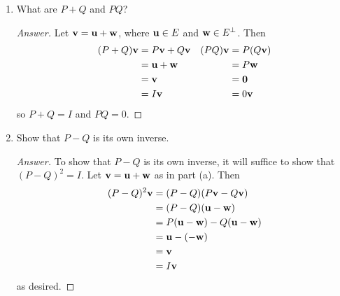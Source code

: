 \documentclass[../psets.tex]{subfiles}
\begin{document}
\begin{enumerate}[label={\textbf{3.\arabic*.}}]
    \begin{enumerate}
        \item What are $P+Q$ and $PQ$?
        \begin{proof}[Answer]
            Let $\mathbf{v}=\mathbf{u}+\mathbf{w}$, where $\mathbf{u}\in E$ and $\mathbf{w}\in E^\perp$. Then
            \begin{align*}
                (P+Q)\mathbf{v} &= P\mathbf{v}+Q\mathbf{v}&
                    (PQ)\mathbf{v} &= P(Q\mathbf{v})\\
                &= \mathbf{u}+\mathbf{w}&
                    &= P\mathbf{w}\\
                &= \mathbf{v}&
                    &= \bm{0}\\
                &= I\mathbf{v}&
                    &= 0\mathbf{v}
            \end{align*}
            so $P+Q=I$ and $PQ=0$.
        \end{proof}
        \item Show that $P-Q$ is its own inverse.
        \begin{proof}[Answer]
            To show that $P-Q$ is its own inverse, it will suffice to show that $(P-Q)^2=I$. Let $\mathbf{v}=\mathbf{u}+\mathbf{w}$ as in part (a). Then
            \begin{align*}
                (P-Q)^2\mathbf{v} &= (P-Q)(P\mathbf{v}-Q\mathbf{v})\\
                &= (P-Q)(\mathbf{u}-\mathbf{w})\\
                &= P(\mathbf{u}-\mathbf{w})-Q(\mathbf{u}-\mathbf{w})\\
                &= \mathbf{u}-(-\mathbf{w})\\
                &= \mathbf{v}\\
                &= I\mathbf{v}
            \end{align*}
            as desired.
        \end{proof}
    \end{enumerate}
\end{enumerate}
\end{document}
